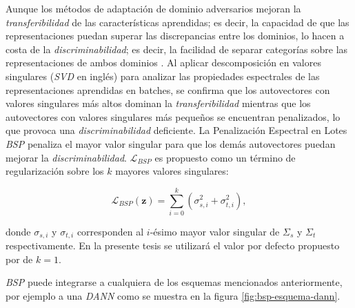Aunque los métodos de adaptación de dominio adversarios mejoran la {\it transferibilidad} de las características
aprendidas; es decir, la capacidad de que las representaciones puedan superar las discrepancias entre los dominios, lo
hacen a costa de la {\it discriminabilidad}; es decir, la facilidad de separar categorías sobre las representaciones de
ambos dominios \parencite{chen2019transferability}. Al aplicar descomposición en valores singulares ({\it SVD} en inglés) para analizar
las propiedades espectrales de las representaciones aprendidas en batches, se confirma que los autovectores con valores
singulares más altos dominan la {\it transferibilidad} mientras que los autovectores con valores singulares más
pequeños se encuentran penalizados, lo que provoca una {\it discriminabilidad} deficiente. La Penalización Espectral en
Lotes {\it BSP} \parencite{chen2019transferability} penaliza el mayor valor singular para que los demás autovectores puedan mejorar la {\it
        discriminabilidad}. $\mathcal{L}_{BSP}$ es propuesto como un término de regularización sobre los $k$ mayores valores
singulares:

\begin{equation}
    \mathcal{L}_{BSP}(\mathbf{z}) = \sum_{i=0}^{k} (\sigma_{s, i}^2 + \sigma_{t, i}^2),
    \label{eq:bsp}
\end{equation}

\noindent
donde $\sigma_{s, i}$ y $\sigma_{t, i}$ corresponden al $i$-ésimo mayor valor singular de $\Sigma_s$ y $\Sigma_t$
respectivamente. En la presente tesis se utilizará el valor por defecto propuesto por \citeauthor{chen2019transferability} de $k=1$.

    {\it BSP} puede integrarse a cualquiera de los esquemas mencionados anteriormente, por ejemplo a una {\it DANN} como se muestra en la figura \ref{fig:bsp-esquema-dann}.

